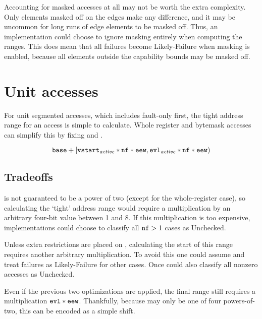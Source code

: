 Accounting for masked accesses at all may not be worth the extra complexity.
Only elements masked off on the edges make any difference, and it may be uncommon for long runs of edge elements to be masked off.
Thus, an implementation could choose to ignore masking entirely when computing the ranges.
This does mean that all failures become Likely-Failure when masking is enabled, because all elements outside the capability bounds may be masked off.

\section{Unit accesses}
For unit segmented accesses, which includes fault-only first, the tight address range for an access is simple to calculate.
Whole register and bytemask accesses can simplify this by fixing  and .

\begin{equation}
    {\texttt{base}}{} + [{\texttt{vstart}}_{\mathit{active}}{} * {\texttt{nf}} * {\texttt{eew}}, {\texttt{evl}}_{\mathit{active}}{} * {\texttt{nf}} * {\texttt{eew}})
\end{equation}

\subsection*{Tradeoffs}
 is not guaranteed to be a power of two (except for the whole-register case), so calculating the `tight' address range would require a multiplication by an arbitrary four-bit value between 1 and 8.
If this multiplication is too expensive, implementations could choose to classify all ${\texttt{nf}} > 1$ cases as Unchecked.

Unless extra restrictions are placed on , calculating the start of this range requires another arbitrary multiplication.
To avoid this one could assume  and treat failures as Likely-Failure for other cases.
Once could also classify all nonzero  accesses as Unchecked.

Even if the previous two optimizations are applied, the final range still requires a multiplication ${\texttt{evl}}{} * {\texttt{eew}}$.
Thankfully, because  may only be one of four powers-of-two, this can be encoded as a simple shift.

